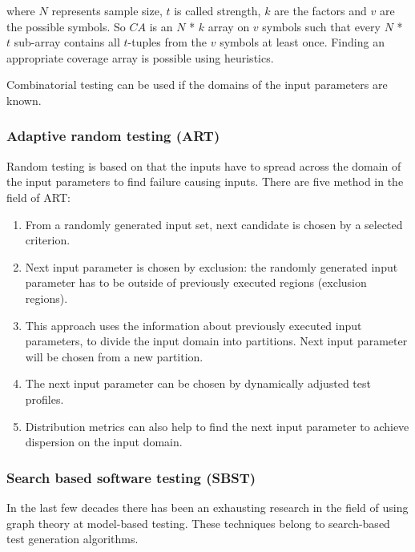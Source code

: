 where $N$ represents sample size, $t$ is called strength, $k$ are the factors and $v$ are the possible symbols. So $CA$ is an $N$ * $k$ array on $v$ symbols such that every $N$ * $t$ sub-array contains all $t$-tuples from the $v$ symbols at least once. Finding an appropriate coverage array is possible using heuristics.

Combinatorial testing can be used if the domains of the input parameters are known.


\subsubsection{Adaptive random testing (ART)}
\label{ssub:randomtesting}

Random testing is based on that the inputs have to spread across the domain of the input parameters to find failure causing inputs. There are five method in the field of ART:

\begin{enumerate}
	\item From a randomly generated input set, next candidate is chosen by a selected criterion.
	\item Next input parameter is chosen by exclusion: the randomly generated input parameter has to be outside of previously executed regions (exclusion regions).
	\item This approach uses the information about previously executed input parameters, to divide the input domain into partitions. Next input parameter will be chosen from a new partition.
	\item The next input parameter can be chosen by dynamically adjusted test profiles.
	\item Distribution metrics can also help to find the next input parameter to achieve dispersion on the input domain.
\end{enumerate}


\subsubsection{Search based software testing (SBST)}
\label{ssub:searchbasedtestgen}

In the last few decades there has been an exhausting research in the field of using graph theory at model-based testing. These techniques belong to search-based test generation algorithms.

